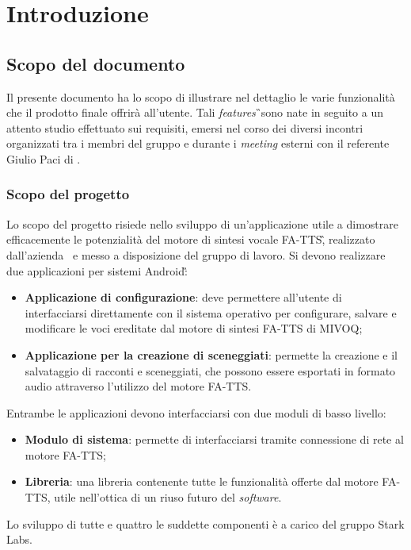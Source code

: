 \section{Introduzione}

\subsection{Scopo del documento}
Il presente documento ha lo scopo di illustrare nel dettaglio le varie funzionalità che il prodotto finale offrirà all'utente. Tali \textit{features}\G\ sono nate in seguito a un attento studio effettuato sui requisiti, emersi nel corso dei diversi incontri organizzati tra i membri del gruppo e durante i \textit{meeting} esterni con il referente Giulio Paci di \AZIENDA.

\subsubsection{Scopo del progetto}
Lo scopo del progetto risiede nello sviluppo di un'applicazione utile a dimostrare efficacemente
le potenzialità del motore di sintesi vocale FA-TTS\G, realizzato dall'azienda \AZIENDA\ e messo a disposizione del gruppo di lavoro. Si devono realizzare due applicazioni per sistemi Android\G:
\begin{itemize}
	\item \textbf{Applicazione di configurazione}: deve permettere all'utente di interfacciarsi direttamente con il sistema operativo per configurare, salvare e modificare le voci ereditate dal motore di sintesi FA-TTS di MIVOQ;
	\item \textbf{Applicazione per la creazione di sceneggiati}: permette la creazione e il salvataggio di racconti e sceneggiati, che possono essere esportati in formato audio attraverso l'utilizzo del motore FA-TTS.
\end{itemize}
Entrambe le applicazioni devono interfacciarsi con due moduli di basso livello:
\begin{itemize}
	\item \textbf{Modulo di sistema}: permette di interfacciarsi tramite connessione di rete al motore FA-TTS;
	\item \textbf{Libreria}: una libreria contenente tutte le funzionalità offerte dal motore FA-TTS, utile nell'ottica di un riuso futuro del \textit{software}.
\end{itemize} 
Lo sviluppo di tutte e quattro le suddette componenti è a carico del gruppo Stark Labs.

